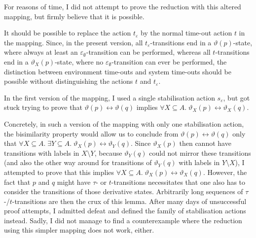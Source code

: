 \begin{isabellebody}
\begin{isamarkuptext}
For reasons of time, I did not attempt to prove the reduction with this altered mapping, but firmly believe that it is possible.%
\end{isamarkuptext}\isamarkuptrue%
%
\isadelimdocument
%
\endisadelimdocument
%
\isatagdocument
%
\isamarkuptrue%
%
\isamarkuptrue%
%
\endisatagdocument
{\isafolddocument}%
%
\isadelimdocument
%
\endisadelimdocument
%
\begin{isamarkuptext}%
It should be possible to replace the action $t_\varepsilon$ by the normal time-out action $t$ in the mapping. Since, in the present version, all $t_\varepsilon$-transitions end in a $\vartheta(p)$-state, where always at least an $\varepsilon_\emptyset$-transition can be performed, whereas all $t$-transitions end in a $\vartheta_X(p)$-state, where no $\varepsilon_\emptyset$-transition can ever be performed, the distinction between environment time-outs and system time-outs should be possible without distinguishing the actions $t$ and $t_\varepsilon$.
\pagebreak%
\end{isamarkuptext}\isamarkuptrue%
%
\isadelimdocument
%
\endisadelimdocument
%
\isatagdocument
%
\isamarkuptrue%
%
\endisatagdocument
{\isafolddocument}%
%
\isadelimdocument
%
\endisadelimdocument
%
\begin{isamarkuptext}%
In the first version of the mapping, I used a single stabilisation action $s_\varepsilon$, but got stuck trying to prove that $\vartheta(p) \leftrightarrow \vartheta(q)$ implies $\forall X \subseteq A .\; \vartheta_X(p) \leftrightarrow \vartheta_X(q)$. 

Concretely, in such a version of the mapping with only one stabilisation action, the bisimilarity property would allow us to conclude from \linebreak $\vartheta(p) \leftrightarrow \vartheta(q)$ only that $\forall X \subseteq A .\; \exists Y \subseteq A .\; \vartheta_X(p) \leftrightarrow \vartheta_Y(q)$. Since $\vartheta_X(p)$ then cannot have transitions with labels in $X \!\setminus\! Y$, because $\vartheta_Y(q)$ could not mirror these transitions (and also the other way around for transitions of $\vartheta_Y(q)$ with labels in $Y \!\setminus\! X$), I attempted to prove that this implies $\forall X \subseteq A .\; \vartheta_X(p) \leftrightarrow \vartheta_X(q)$. However, the fact that $p$ and $q$ might have $\tau$- or $t$-transitions necessitates that one also has to consider the transitions of those derivative states. Arbitrarily long sequences of $\tau$-/$t$-transitions are then the crux of this lemma.
After many days of unsuccessful proof attempts, I admitted defeat and defined the family of stabilisation actions instead. Sadly, I did not manage to find a counterexample where the reduction using this simpler mapping does not work, either.


\end{isamarkuptext}
\end{isabellebody}
